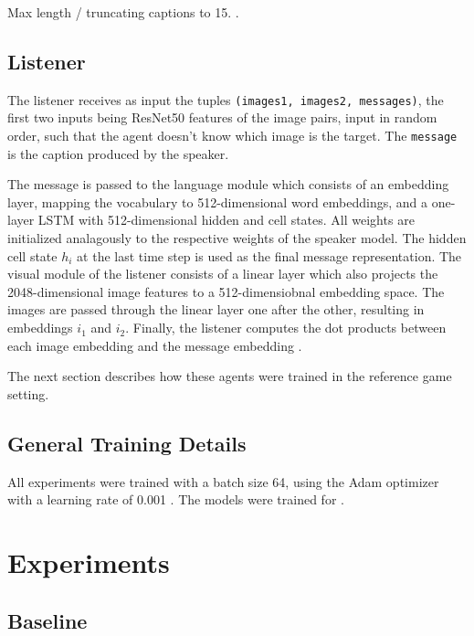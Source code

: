 Max length / truncating captions to 15. 
.

\subsection{Listener}
The listener receives as input the tuples \texttt{(images1, images2, messages)}, the first two inputs being ResNet50 features of the image pairs, input in random order, such that the agent doesn't know which image is the target. The \texttt{message} is the caption produced by the speaker. 

The message is passed to the language module which consists of an embedding layer, mapping the vocabulary to 512-dimensional word embeddings, and a one-layer LSTM with 512-dimensional hidden and cell states. All weights are initialized analagously to the respective weights of the speaker model. The hidden cell state $h_i$ at the last time step is used as the final message representation. 
The visual module of the listener consists of a linear layer which also projects the 2048-dimensional image features to a 512-dimensiobnal embedding space. The images are passed through the linear layer one after the other, resulting in embeddings $i_1$ and $i_2$.  Finally, the listener computes the dot products between each image embedding and the message embedding . 

The next section describes how these agents were trained in the reference game setting.

\subsection{General Training Details}

All experiments were trained with a batch size 64, using the Adam optimizer with a learning rate  of 0.001 \parencite{kingma2014adam}. The models were trained for . 

\section{Experiments}

\subsection{Baseline}


